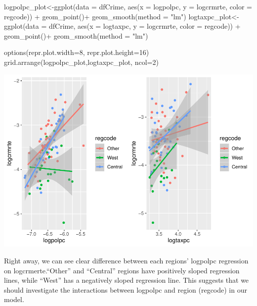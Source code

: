 \documentclass[]{article}
\newenvironment{Shaded}{}{}
\newcommand{\DataTypeTok}[1]{#1}
\newcommand{\DecValTok}[1]{#1}
\newcommand{\KeywordTok}[1]{\textcolor[rgb]{0.00,0.00,1.00}{#1}}
\newcommand{\NormalTok}[1]{#1}
\newcommand{\OperatorTok}[1]{#1}
\newcommand{\StringTok}[1]{\textcolor[rgb]{0.00,0.50,0.50}{#1}}
\begin{document}
\begin{Shaded}
\begin{Highlighting}[]
\NormalTok{logpolpc_plot<-}\KeywordTok{ggplot}\NormalTok{(}\DataTypeTok{data =}\NormalTok{ dfCrime, }\KeywordTok{aes}\NormalTok{(}\DataTypeTok{x =}\NormalTok{ logpolpc, }\DataTypeTok{y =}\NormalTok{ logcrmrte, }\DataTypeTok{color =}\NormalTok{ regcode)) }\OperatorTok{+}
\StringTok{      }\KeywordTok{geom_point}\NormalTok{()}\OperatorTok{+}
\StringTok{  }\KeywordTok{geom_smooth}\NormalTok{(}\DataTypeTok{method =} \StringTok{"lm"}\NormalTok{)}
\NormalTok{logtaxpc_plot<-}\KeywordTok{ggplot}\NormalTok{(}\DataTypeTok{data =}\NormalTok{ dfCrime, }\KeywordTok{aes}\NormalTok{(}\DataTypeTok{x =}\NormalTok{ logtaxpc, }\DataTypeTok{y =}\NormalTok{ logcrmrte, }\DataTypeTok{color =}\NormalTok{ regcode)) }\OperatorTok{+}
\StringTok{      }\KeywordTok{geom_point}\NormalTok{()}\OperatorTok{+}
\StringTok{  }\KeywordTok{geom_smooth}\NormalTok{(}\DataTypeTok{method =} \StringTok{"lm"}\NormalTok{)}

\KeywordTok{options}\NormalTok{(}\DataTypeTok{repr.plot.width=}\DecValTok{8}\NormalTok{, }\DataTypeTok{repr.plot.height=}\DecValTok{16}\NormalTok{)}
\KeywordTok{grid.arrange}\NormalTok{(logpolpc_plot,logtaxpc_plot, }\DataTypeTok{ncol=}\DecValTok{2}\NormalTok{)}
\end{Highlighting}
\end{Shaded}

\includegraphics{Bagnard_Gaustad_Hartman_Leung_Lab_3_files/figure-latex/unnamed-chunk-69-1.pdf}

Right away, we can see clear difference between each regions' logpolpc
regression on logcrmerte.``Other'' and ``Central'' regions have
positively sloped regression lines, while ``West'' has a negatively
sloped regression line. This suggests that we should investigate the
interactions between logpolpc and region (regcode) in our model.
\end{document}
